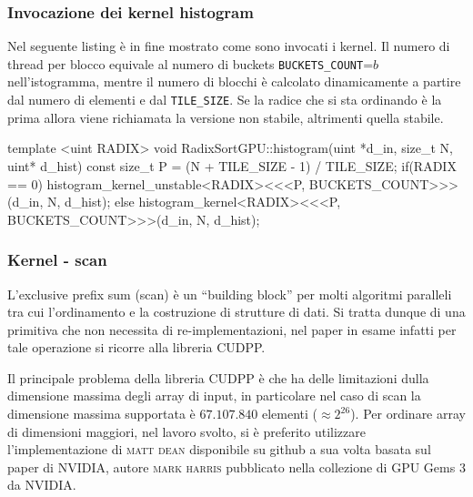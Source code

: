 \subsubsection{Invocazione dei kernel histogram}
Nel seguente listing è in fine mostrato come sono invocati i kernel. Il numero di thread per blocco equivale al numero di buckets \texttt{BUCKETS\_COUNT}=$b$ nell'istogramma, mentre il numero di blocchi è calcolato dinamicamente a partire dal numero di elementi e dal \texttt{TILE\_SIZE}.
Se la radice che si sta ordinando è la prima allora viene richiamata la versione non stabile, altrimenti quella stabile.
\begin{figure*}[!hpt]
\begin{cpp}
template <uint RADIX>
void RadixSortGPU::histogram(uint *d_in, size_t N, uint* d_hist){
	const size_t P = (N + TILE_SIZE - 1) / TILE_SIZE;
	if(RADIX == 0)
		histogram_kernel_unstable<RADIX><<<P, BUCKETS_COUNT>>>(d_in, N, d_hist);
	else
		histogram_kernel<RADIX><<<P, BUCKETS_COUNT>>>(d_in, N, d_hist);
}
\end{cpp}
\end{figure*}


\subsubsection{Kernel - {scan}}
L'exclusive prefix sum (scan) è un \enquote{building block} per molti algoritmi paralleli tra cui l'ordinamento e la costruzione di strutture di dati. Si tratta dunque di una primitiva che non necessita di re-implementazioni, nel paper in esame infatti per tale operazione si ricorre alla libreria CUDPP. 

Il principale problema della libreria CUDPP è che ha delle limitazioni dulla dimensione massima degli array di input, in particolare nel caso di scan la dimensione massima supportata è $67.107.840$ elementi ($\approx 2^{26}$). Per ordinare array di dimensioni maggiori, nel lavoro svolto, si è preferito utilizzare l'implementazione di \textsc{matt dean} \cite{mattdean1} disponibile su github a sua volta basata sul paper \cite{harris2007parallel} di NVIDIA, autore \textsc{mark harris} pubblicato nella collezione di GPU Gems 3 da NVIDIA. 




